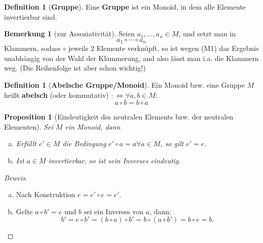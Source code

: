 \documentclass[a4paper]{article}
\theoremstyle{plain}
\newtheorem{prop}[thm]{Proposition}
\theoremstyle{definition}
\newtheorem{defi}[thm]{Definition}
\newtheorem{bem}[thm]{Bemerkung}
\begin{document}
\begin{defi}[\textbf{Gruppe}]%
Eine \textbf{Gruppe} ist ein Monoid, in dem alle Elemente invertierbar sind.
\end{defi}
\begin{bem}[zur Assoziativität]%
Seien $a_{1}, ..., a_{n} \in M$, und setzt man in
$$a_{1} \circ \cdots \circ a_{n}$$
Klammern, sodass $\circ$ jeweils 2 Elemente verknüpft, so ist wegen (M1) das Ergebnis unabhängig von der Wahl der Klammerung, and also lässt man i.a. die Klammern weg. (Die Reihenfolge ist aber schon wichtig!)
\end{bem}
\begin{defi}[\textbf{Abelsche Gruppe/Monoid}] %
Ein Monoid bzw. eine Gruppe $M$ heißt \textbf{abelsch} (oder kommutativ) $:\iff \forall a, b \in M:$ $$a \circ b = b \circ a$$
\end{defi}
\begin{prop}[Eindeutigkeit des neutralen Elements bzw. der neutralen Elementen]
  Sei $M$ ein Monoid, dann
  \begin{enumerate}[(a)]
    \item Erfüllt $e' \in M$ die Bedingung $e' \circ a = a \forall a \in M$, so gilt $e' = e$.
    \item Ist $a \in M$ invertierbar, so ist sein Inverses eindeutig.
  \end{enumerate}
\end{prop}
\begin{proof}[Beweis] \item
\begin{enumerate}[(a)]
  \item Nach Konstruktion $e = e' \circ e = e'$.
\item Gelte $a \circ b' = e$ und $b$ sei ein Inverses von $a$, dann:
$$b' = e \circ b' = (b \circ a) \circ b' = b \circ (a \circ b') = b \circ e = b. $$
\end{enumerate}
\end{proof}
\end{document}
